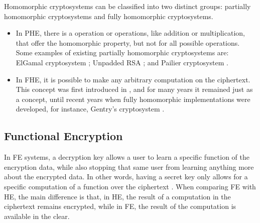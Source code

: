 Homomorphic cryptosystems can be classified into two distinct groups: partially homomorphic cryptosystems and fully homomorphic cryptosystems.

\begin{itemize}
    \setlength\itemsep{1em}
    \item In \ac{PHE}, there is a operation or operations, like addition or multiplication, that offer the homomorphic property, but not for all possible operations. Some examples of existing partially homomorphic cryptosystems are:
    ElGamal cryptosystem \cite{elgamal1985public}; Unpadded RSA \cite{rivest1978method}; and Pailier cryptosystem \cite{paillier1999public}.

    \item In \ac{FHE}, it is possible to make any arbitrary computation on the ciphertext. This concept was first introduced in \cite{rivest1978data}, and for many years it remained just as a concept, until recent years when fully homomorphic implementations were developed, for instance, Gentry's cryptosystem \cite{gentry2009fully}.
\end{itemize}


\subsection{Functional Encryption}
\label{ssec:FunctionalEncryption}


In \acf{FE} systems, a decryption key allows a user to learn a specific function of the encryption data, while also stopping that same user from learning anything more about the encrypted data. In other words, having a secret key only allows for a specific computation of a function over the ciphertext \cite{boneh2011functional}. When comparing \ac{FE} with \ac{HE}, the main difference is that, in \ac{HE}, the result of a computation in the ciphertext remains encrypted, while in \ac{FE}, the result of the computation is available in the clear.




